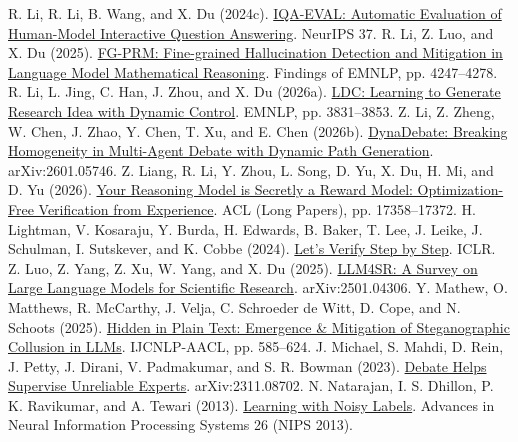 \begin{thebibliography}{}
 R. Li, R. Li, B. Wang, and X. Du (2024c). \href{https://proceedings.neurips.cc/paper_files/paper/2024/file/c6a23b26eaaefd187973658f5001f4fe-Paper-Conference.pdf}{IQA-EVAL: Automatic Evaluation of Human-Model Interactive Question Answering}. NeurIPS 37.
 R. Li, Z. Luo, and X. Du (2025). \href{https://aclanthology.org/2025.findings-emnlp.228/}{FG-PRM: Fine-grained Hallucination Detection and Mitigation in Language Model Mathematical Reasoning}. Findings of EMNLP, pp. 4247--4278.
 R. Li, L. Jing, C. Han, J. Zhou, and X. Du (2026a). \href{https://aclanthology.org/2026.emnlp-main.167/}{LDC: Learning to Generate Research Idea with Dynamic Control}. EMNLP, pp. 3831--3853.
 Z. Li, Z. Zheng, W. Chen, J. Zhao, Y. Chen, T. Xu, and E. Chen (2026b). \href{https://arxiv.org/abs/2601.05746}{DynaDebate: Breaking Homogeneity in Multi-Agent Debate with Dynamic Path Generation}. arXiv:2601.05746.
 Z. Liang, R. Li, Y. Zhou, L. Song, D. Yu, X. Du, H. Mi, and D. Yu (2026). \href{https://aclanthology.org/2026.acl-long.788/}{Your Reasoning Model is Secretly a Reward Model: Optimization-Free Verification from Experience}. ACL (Long Papers), pp. 17358--17372.
 H. Lightman, V. Kosaraju, Y. Burda, H. Edwards, B. Baker, T. Lee, J. Leike, J. Schulman, I. Sutskever, and K. Cobbe (2024). \href{https://openreview.net/forum?id=v8L0pN6EOi}{Let's Verify Step by Step}. ICLR.
 Z. Luo, Z. Yang, Z. Xu, W. Yang, and X. Du (2025). \href{https://arxiv.org/abs/2501.04306}{LLM4SR: A Survey on Large Language Models for Scientific Research}. arXiv:2501.04306.
 Y. Mathew, O. Matthews, R. McCarthy, J. Velja, C. Schroeder de Witt, D. Cope, and N. Schoots (2025). \href{https://doi.org/10.18653/v1/2025.ijcnlp-long.34}{Hidden in Plain Text: Emergence \& Mitigation of Steganographic Collusion in LLMs}. IJCNLP-AACL, pp. 585--624.
 J. Michael, S. Mahdi, D. Rein, J. Petty, J. Dirani, V. Padmakumar, and S. R. Bowman (2023). \href{https://arxiv.org/abs/2311.08702}{Debate Helps Supervise Unreliable Experts}. arXiv:2311.08702.
 N. Natarajan, I. S. Dhillon, P. K. Ravikumar, and A. Tewari (2013). \href{https://papers.nips.cc/paper_files/paper/2013/hash/3871bd64012152bfb53fdf04b401193f-Abstract.html}{Learning with Noisy Labels}. Advances in Neural Information Processing Systems 26 (NIPS 2013).

\end{thebibliography}
